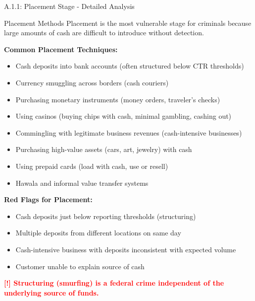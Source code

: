 \documentclass[11pt,a4paper]{beamer}
\newcommand{\redflag}[1]{\textcolor{red}{\textbf{[!] #1}}}
\begin{document}
	\begin{frame}{A.1.1: Placement Stage - Detailed Analysis}
		\begin{block}{Placement Methods}
			Placement is the most vulnerable stage for criminals because large amounts of cash are difficult to introduce without detection.
		\end{block}
		\textbf{Common Placement Techniques:}
		\begin{itemize}
			\item Cash deposits into bank accounts (often structured below CTR thresholds)
			\item Currency smuggling across borders (cash couriers)
			\item Purchasing monetary instruments (money orders, traveler's checks)
			\item Using casinos (buying chips with cash, minimal gambling, cashing out)
			\item Commingling with legitimate business revenues (cash-intensive businesses)
			\item Purchasing high-value assets (cars, art, jewelry) with cash
			\item Using prepaid cards (load with cash, use or resell)
			\item Hawala and informal value transfer systems
		\end{itemize}
		\textbf{Red Flags for Placement:}
		\begin{itemize}
			\item Cash deposits just below reporting thresholds (structuring)
			\item Multiple deposits from different locations on same day
			\item Cash-intensive business with deposits inconsistent with expected volume
			\item Customer unable to explain source of cash
		\end{itemize}
		\redflag{Structuring (smurfing) is a federal crime independent of the underlying source of funds.}
	\end{frame}
	
\end{document}
